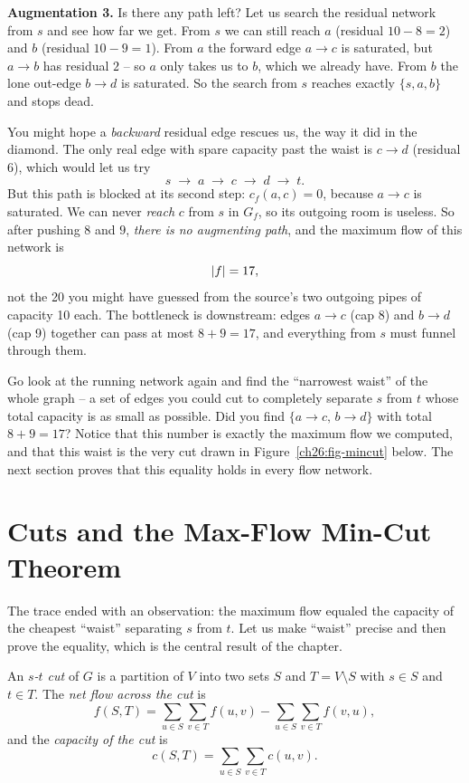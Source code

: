 \textbf{Augmentation 3.} Is there any path left? Let us search the residual
network from $s$ and see how far we get. From $s$ we can still reach $a$
(residual $10-8=2$) and $b$ (residual $10-9=1$). From $a$ the forward edge
$a\to c$ is saturated, but $a\to b$ has residual $2$ -- so $a$ only takes us to
$b$, which we already have. From $b$ the lone out-edge $b\to d$ is saturated. So
the search from $s$ reaches exactly $\{s,a,b\}$ and stops dead.

You might hope a \emph{backward} residual edge rescues us, the way it did in the
diamond. The only real edge with spare capacity past the waist is $c\to d$
(residual $6$), which would let us try
\[
  s \;\to\; a \;\to\; c \;\to\; d \;\to\; t.
\]
But this path is blocked at its second step: $c_f(a,c)=0$, because $a\to c$ is
saturated. We can never \emph{reach} $c$ from $s$ in $G_f$, so its outgoing room
is useless. So after pushing $8$ and $9$, \emph{there is no
augmenting path}, and the maximum flow of this network is
\[
  \lvert f\rvert = 17,
\]
not the 20 you might have guessed from the source's two outgoing pipes of
capacity 10 each. The bottleneck is downstream: edges $a\to c$ (cap 8) and
$b \to d$ (cap 9) together can pass at most $8+9 = 17$, and everything from $s$
must funnel through them.

\begin{walkbox}
Go look at the running network again and find the ``narrowest waist'' of the
whole graph -- a set of edges you could cut to completely separate $s$ from $t$
whose total capacity is as small as possible. Did you find $\{a\to c,\,b\to
d\}$ with total $8 + 9 = 17$? Notice that this number is exactly the maximum
flow we computed, and that this waist is the very cut drawn in
Figure~\ref{ch26:fig-mincut} below. The next section proves that this
equality holds in every flow network.
\end{walkbox}

\section{Cuts and the Max-Flow Min-Cut Theorem}
\label{ch26:mincut}

The trace ended with an observation: the maximum flow equaled the capacity of
the cheapest ``waist'' separating $s$ from $t$. Let us make ``waist'' precise
and then prove the equality, which is the central result of the chapter.

\begin{definition}[Cut]
\label{ch26:def-cut}
An \emph{$s$-$t$ cut} of $G$ is a partition of $V$ into two sets $S$ and
$T = V \setminus S$ with $s \in S$ and $t \in T$. The \emph{net flow across the
cut} is
\[
  f(S,T) = \sum_{u \in S}\sum_{v \in T} f(u,v) - \sum_{u \in S}\sum_{v \in T} f(v,u),
\]
and the \emph{capacity of the cut} is
\[
  c(S,T) = \sum_{u \in S}\sum_{v \in T} c(u,v).
\]
\end{definition}

